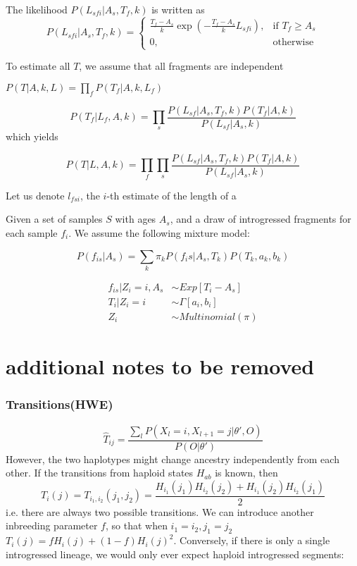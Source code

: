 \documentclass[10pt,a4paper]{article}
\begin{document}
The likelihood $P(L_{sfi} | A_s, T_f, k)$ is written as
\begin{equation}
P(L_{sfi} | A_s, T_f, k) = 
	\begin{cases}
		    \frac{T_f - A_s}{k} \exp\left(- \frac{T_f - A_s}{k} L_{sfi}\right)  ,& \text{if } T_f \geq A_s \\
				0,              & \text{otherwise}
	\end{cases}
\end{equation}

To estimate all $T$, we assume that all fragments are independent

$P(T | A, k, L) = \prod_f P(T_f | A, k, L_f)$

\begin{equation}
P(T_f | L_{f}, A, k) = \prod_s
\frac{P(L_{sf} | A_s, T_f, k)P(T_f | A, k)}{P(L_{sf} | A_s, k)}
\end{equation}
which yields

\begin{equation}
P(T | L, A, k) = \prod_f\prod_s
\frac{P(L_{sf} | A_s, T_f, k)P(T_f | A, k)}{P(L_{sf} | A_s, k)}
\end{equation}



Let us denote $l_{fsi}$, the $i$-th estimate of the length of a


Given a set of samples $S$ with ages $A_s$, and a draw of introgressed fragments for each sample $f_i$. We assume the following mixture model:

$$P(f_{is}|A_s) = \sum_k \pi_{k} P(f_is | A_s, T_k) P(T_k, a_k, b_k)$$



\begin{align}
f_{is} | Z_i=i, A_s &\sim Exp[T_i - A_s]\\
T_i | Z_i= i &\sim \Gamma[a_i, b_i]\\
Z_i  &\sim Multinomial(\pi)
\end{align}


\section{additional notes to be removed}

\subsubsection{Transitions(HWE)}
$$\hat{T}_{ij} = \frac{\sum_l P(X_l=i, X_{l+1}=j| \theta', O)}{ P(O | \theta')}$$
However, the two haplotypes might change ancestry independently from each other. If the transitions from haploid states $H_{ab}$ is known, then 
$$T_i(j) = T_{i_1, i_2}(j_1, j_2) = \frac{H_{i_1}(j_1)H_{i_2}(j_2) + H_{i_1}(j_2)H_{i_2}(j_1)}{2}$$
i.e. there are always two possible transitions. We can introduce another inbreeding parameter $f$, so that when $i_1=i_2, j_1=j_2$ 
$T_i(j) = f H_i(j) + (1-f) H_i(j)^2$. Conversely, if there is only a single introgressed lineage, we would only ever expect haploid introgressed segments:
\end{document}
